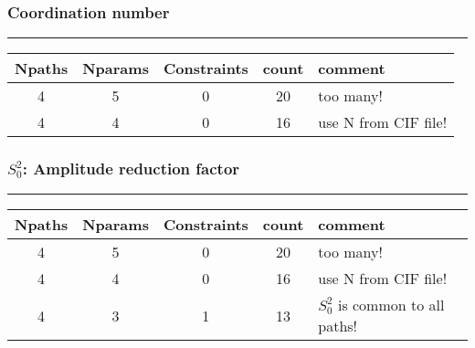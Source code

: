 \documentclass[10pt, xcolor=x11names, compress]{beamer}
\begin{document}
\begin{frame}
  \frametitle{Coordination number}
  \exafsequation

  \smallskip

  \par\noindent\rule{\textwidth}{0.4pt}
  
  \begin{overlayarea}{\linewidth}{0.5\textheight} 
    \begin{center}
      \begin{tabular}{ccccl}
        Npaths & Nparams & Constraints & count & comment \\
        \hline
        {\color{Gray0}4} & {\color{Gray0}5} & {\color{Gray0}0} & {\color{Gray0}20} & {\color{Gray0}too many!}\\
        4 & \alert{4} & \alert{0} & \alert{16} & \alert{use N from CIF file!}\\
        \hline
      \end{tabular}
    \end{center}
  \end{overlayarea}
\end{frame}

\begin{frame}
  \frametitle{$S_0^2$: Amplitude reduction factor}
  \exafsequation

  \smallskip

  \par\noindent\rule{\textwidth}{0.4pt}
  
  \begin{overlayarea}{\linewidth}{0.5\textheight} 
    \begin{center}
      \begin{tabular}{ccccl}
        Npaths & Nparams & Constraints & count & comment \\
        \hline
        {\color{Gray0}4} & {\color{Gray0}5} & {\color{Gray0}0} & {\color{Gray0}20} & {\color{Gray0}too many!}\\
        {\color{Gray0}4} & {\color{Gray0}4} & {\color{Gray0}0} & {\color{Gray0}16} & {\color{Gray0}use N from CIF file!}\\
        4 & \alert{3} & \alert{1} & \alert{13} & \alert{$S_0^2$ is common to all paths!}\\
        \hline
      \end{tabular}
    \end{center}
  \end{overlayarea}
\end{frame}
\end{document}
